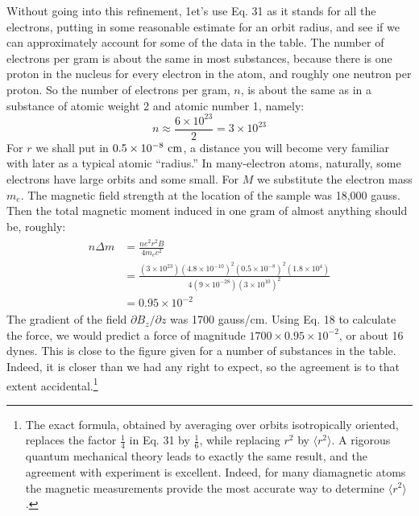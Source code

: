 Without going into this refinement, 1et's use Eq. 31 as it stands
for all the electrons, putting in some reasonable estimate for an orbit
radius, and see if we can approximately account for some of the data
in the table. The number of electrons per gram is about the same
in most substances, because there is one proton in the nucleus for
every electron in the atom, and roughly one neutron per proton. So
the number of electrons per gram, $n$, is about the same as in a substance
of atomic weight 2 and atomic number 1, namely:
\begin{equation}
  n \approx \frac{6\times10^{23}}{2} = 3\times10^{23}
\end{equation}
For $r$ we shall put in $0.5 \times 10^{-8}\ \cmunit$, a distance you will become very
familiar with later as a typical atomic ``radius.'' In many-electron
atoms, naturally, some electrons have large orbits and some small.
For $M$ we substitute the electron mass $m_e$. The magnetic field
strength at the location of the sample was 18,000 gauss. Then the
total magnetic moment induced in one gram of almost anything
should be, roughly:
\begin{align}
\begin{split}
  n\Delta m &= \frac{ne^2r^2B}{4m_ec^2} \\
      &= \frac{(3\times10^{23})(4.8\times10^{-10})^2(0.5\times10^{-8})^2(1.8\times10^4)}
              {4(9\times10^{-28})(3\times10^{10})^2} \\
      &= 0.95\times10^{-2}
\end{split}
\end{align}
The gradient of the field $\partial B_z/\partial z$ was 1700 gauss/cm. Using Eq. 18
to calculate the force, we would predict a force of magnitude
$1700 \times 0.95 \times 10^{-2}$, or about 16 dynes. This is close to the figure
given for a number of substances in the table. Indeed, it is closer
than we had any right to expect, so the agreement is to that extent
accidental.\footnote{The exact formula, obtained by averaging over orbits isotropically oriented, replaces
the factor $\frac{1}{4}$ in Eq. 31 by $\frac{1}{6}$, while replacing $r^2$ by $\langle r^2 \rangle$.
A rigorous quantum
mechanical theory leads to exactly the same result, and the agreement with 
experiment is excellent. Indeed, for many diamagnetic atoms the magnetic measurements
provide the most accurate way to determine $\langle r^2 \rangle$.
}

